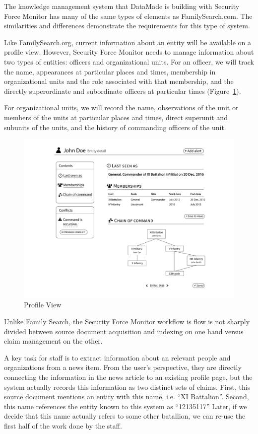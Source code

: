 \documentclass[format=siggraph, review=true]{acmart}
\begin{document}
The knowledge management system that DataMade is building with
Security Force Monitor has many of the same types of elements as
FamilySearch.com. The similarities and differences demonstrate the
requirements for this type of system.

Like FamilySearch.org, current information about an entity will be
available on a profile view. However, Security Force Monitor needs to
manage information about two types of entities: officers and
organizational units. For an officer, we will track the name,
appearances at particular places and times, membership in
organizational units and the role associated with that membership, and
the directly superordinate and subordinate officers at particular
times (Figure~\ref{fig:entity-detail}).

For organizational units, we will record the name, observations of the
unit or members of the units at particular places and times, direct
superunit and subunits of the units, and the history of commanding
officers of the unit.

\begin{figure}[h]
\includegraphics[width=\columnwidth]{images/sketches/entity-detail.png}
\caption{Profile View}
\label{fig:entity-detail}
\end{figure}

Unlike Family Search, the Security Force Monitor workflow is flow is
not sharply divided between source document acquisition and indexing
on one hand versus claim management on the other.

A key task for staff is to extract information about an relevant
people and organizations from a news item. From the user's
perspective, they are directly connecting the information in the news
article to an existing profile page, but the system actually records
this information as two distinct sets of claims. First, this source
document mentions an entity with this name, i.e. ``XI
Battalion''. Second, this name references the entity known to this
system as ``12135117'' Later, if we decide that this name actually
refers to some other batallion, we can re-use the first half of the
work done by the staff.
\end{document}
